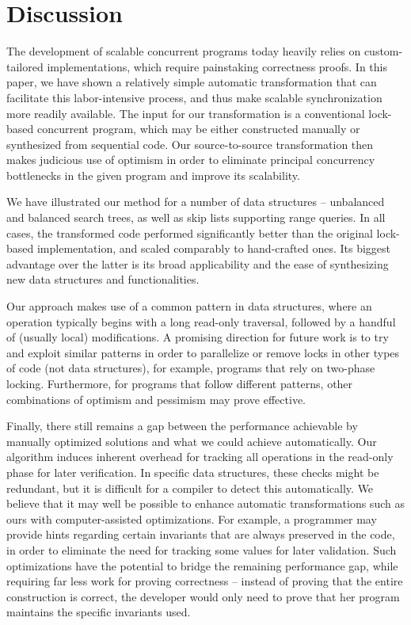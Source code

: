 \section{Discussion}\label{sec:discussion}

The development of scalable concurrent programs today
heavily relies on custom-tailored implementations, which require painstaking correctness proofs. 
In this paper, we have shown a relatively simple automatic transformation that can facilitate this labor-intensive process, and 
thus make scalable synchronization more readily available.
The input for our transformation is a conventional lock-based concurrent program, which may be either constructed manually or 
synthesized from sequential code. Our source-to-source transformation then makes judicious use of optimism in order to 
eliminate principal concurrency bottlenecks in the given program and improve its scalability.

We have illustrated our method for a number of data structures -- unbalanced and balanced search trees,  as well as
skip lists supporting range queries. In all cases, the transformed code performed significantly better than the original
lock-based implementation, and scaled comparably  to hand-crafted  ones. Its biggest advantage over the latter is 
its broad applicability and the ease of synthesizing new data structures and functionalities. 

Our approach makes use of a common pattern in data structures, where an operation typically begins with a long read-only traversal, followed by a handful of (usually local) modifications. 
A promising direction for future work  is to try and 
exploit similar patterns in order to parallelize or remove locks in other types of code (not data structures), for example, programs that rely on two-phase locking.
Furthermore, for programs that follow different patterns, other combinations of optimism and pessimism may prove effective.

Finally, there still remains a gap between the performance achievable by manually optimized solutions and what we could achieve automatically. Our algorithm induces inherent overhead for tracking all operations in the read-only phase for later verification.
In specific data structures, these checks might be redundant, but it is difficult for a compiler to detect this automatically. We believe that
it may well be possible to enhance automatic transformations such as ours with computer-assisted optimizations. For example, a programmer may provide hints regarding certain 
invariants that are always preserved in the code, in order to eliminate the need for tracking some values for later
validation. Such optimizations have the potential to bridge the remaining performance gap, while requiring far less work 
for proving correctness -- instead of proving that the entire construction is correct, the developer would only need to 
prove that her program maintains the specific invariants used.
